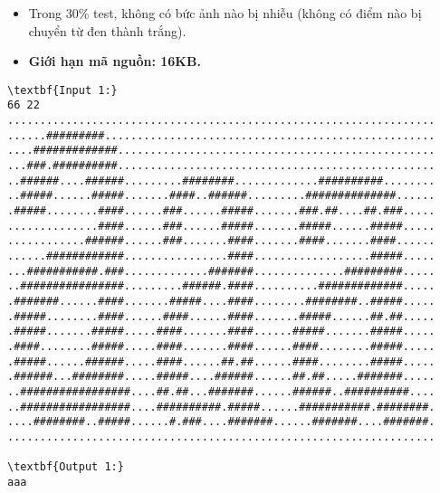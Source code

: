 \begin{itemize}
	\item 

     Trong 30\% test, không có bức ảnh nào bị nhiễu (không có điểm nào bị chuyển từ đen thành trắng).    
	\item 

\textbf{      Giới hạn mã nguồn: 16KB.     }
\end{itemize}
\begin{verbatim}
\textbf{Input 1:}
66 22
..................................................................
......#########...................................................
....#############.................................................
...###.##########.................................................
..######....######.........########.............##########........
..#####......#####.......####..######.........##############......
.#####........####......###......#####.......###.##....##.###.....
..............####......###......#####.......#####......#####.....
............######......###.......####.......####.......####......
......############................####..................#####.....
...###########.###.............#######..............#########.....
..################.........######.####..........#############.....
.#######......####.......#####....####........########..#####.....
.#####........####......####......####.......#####......##.##.....
.#####.......#####.....####.......####......#####.......#####.....
.####........#####.....####.......####......####........#####.....
.#####......######.....####......##.##......####........#####.....
.######...########.....#####....######......##.##.....#######.....
..#################....##.##...#######......######..##########....
..#################....##########.#####......###########.########.
....########..#####......#.###....#######......#######....#######.
..................................................................

\textbf{Output 1:}
aaa


\end{verbatim}
